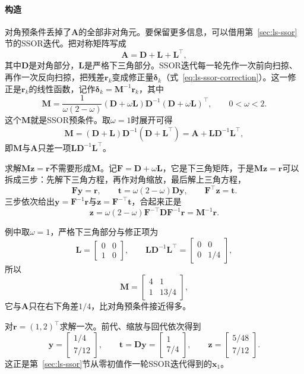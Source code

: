 \paragraph{构造}
对角预条件丢掉了$\bm A$的全部非对角元。要保留更多信息，可以借用第~\ref{sec:ls-ssor}节的SSOR迭代。把对称矩阵写成
\[
 \bm A=\bm D+\bm L+\bm L^\top ,
\]
其中$\bm D$是对角部分，$\bm L$是严格下三角部分。SSOR迭代每一轮先作一次前向扫掠、再作一次反向扫掠，把残差$\bm r_k$变成修正量$\bm\delta_k$（式~\eqref{eq:ls-ssor-correction}）。这一修正是$\bm r_k$的线性函数，记作$\bm\delta_k=\bm M^{-1}\bm r_k$，其中
\begin{equation}
 \bm M=\frac{1}{\omega(2-\omega)}(\bm D+\omega\bm L)\bm D^{-1}(\bm D+\omega\bm L)^\top,\qquad 0<\omega<2 .
 \label{eq:ls-ssor-preconditioner-matrix}
\end{equation}
这个$\bm M$就是SSOR预条件。取$\omega=1$时展开可得
\begin{equation}
 \bm M=(\bm D+\bm L)\bm D^{-1}(\bm D+\bm L^\top)=\bm A+\bm L\bm D^{-1}\bm L^\top ,
 \label{eq:ls-ssor-preconditioner-difference}
\end{equation}
即$\bm M$与$\bm A$只差一项$\bm L\bm D^{-1}\bm L^\top$。

求解$\bm M\bm z=\bm r$不需要形成$\bm M$。记$\bm F=\bm D+\omega\bm L$，它是下三角矩阵，于是$\bm M\bm z=\bm r$可以拆成三步：先解下三角方程，再作对角缩放，最后解上三角方程，
\begin{equation}
 \bm F\bm y=\bm r,\qquad \bm t=\omega(2-\omega)\bm D\bm y,\qquad \bm F^\top\bm z=\bm t .
 \label{eq:ls-ssor-preconditioner}
\end{equation}
三步依次给出$\bm y=\bm F^{-1}\bm r$与$\bm z=\bm F^{-\top}\bm t$，合起来正是
\[
 \bm z=\omega(2-\omega)\bm F^{-\top}\bm D\bm F^{-1}\bm r=\bm M^{-1}\bm r .
\]

例中取$\omega=1$，严格下三角部分与修正项为
\[
 \bm L=\begin{bmatrix}0&0\\1&0\end{bmatrix},\qquad
 \bm L\bm D^{-1}\bm L^\top=\begin{bmatrix}0&0\\0&1/4\end{bmatrix},
\]
所以
\[
 \bm M=\begin{bmatrix}4&1\\1&13/4\end{bmatrix},
\]
它与$\bm A$只在右下角差$1/4$，比对角预条件接近得多。

对$\bm r=(1,2)^\top$求解一次。前代、缩放与回代依次得到
\[
 \bm y=\begin{bmatrix}1/4\\7/12\end{bmatrix},\qquad
 \bm t=\bm D\bm y=\begin{bmatrix}1\\7/4\end{bmatrix},\qquad
 \bm z=\begin{bmatrix}5/48\\7/12\end{bmatrix}.
\]
这正是第~\ref{sec:ls-ssor}节从零初值作一轮SSOR迭代得到的$\bm x_1$。

